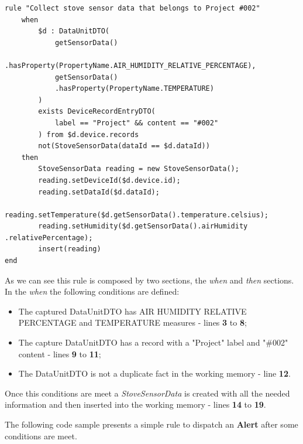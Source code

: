 \begin{lstlisting}[style=drools, caption=Rule Scenario Example - Part 2, label={code:implementation:description:rule:sample2}]
rule "Collect stove sensor data that belongs to Project #002"
    when
        $d : DataUnitDTO(
            getSensorData()
            .hasProperty(PropertyName.AIR_HUMIDITY_RELATIVE_PERCENTAGE),
            getSensorData()
            .hasProperty(PropertyName.TEMPERATURE)
        )
        exists DeviceRecordEntryDTO(
            label == "Project" && content == "#002"
        ) from $d.device.records
        not(StoveSensorData(dataId == $d.dataId))
    then
        StoveSensorData reading = new StoveSensorData();
        reading.setDeviceId($d.device.id);
        reading.setDataId($d.dataId);
        reading.setTemperature($d.getSensorData().temperature.celsius);
        reading.setHumidity($d.getSensorData().airHumidity .relativePercentage);
        insert(reading)
end
\end{lstlisting}

As we can see this rule is composed by two sections, the \textit{when} and \textit{then} sections. In the \textit{when} the following conditions are defined:

\begin{itemize}
    \item The captured DataUnitDTO has AIR HUMIDITY RELATIVE PERCENTAGE and TEMPERATURE measures - lines \textbf{3} to \textbf{8};
    \item The capture DataUnitDTO has a record with a "Project" label and "\#002" content - lines \textbf{9} to \textbf{11};
    \item The DataUnitDTO is not a duplicate fact in the working memory - line \textbf{12}.
\end{itemize}

Once this conditions are meet a \textit{StoveSensorData} is created with all the needed information and then inserted into the working memory - lines \textbf{14} to \textbf{19}.

The following code sample presents a simple rule to dispatch an \textbf{Alert} after some conditions are meet.


